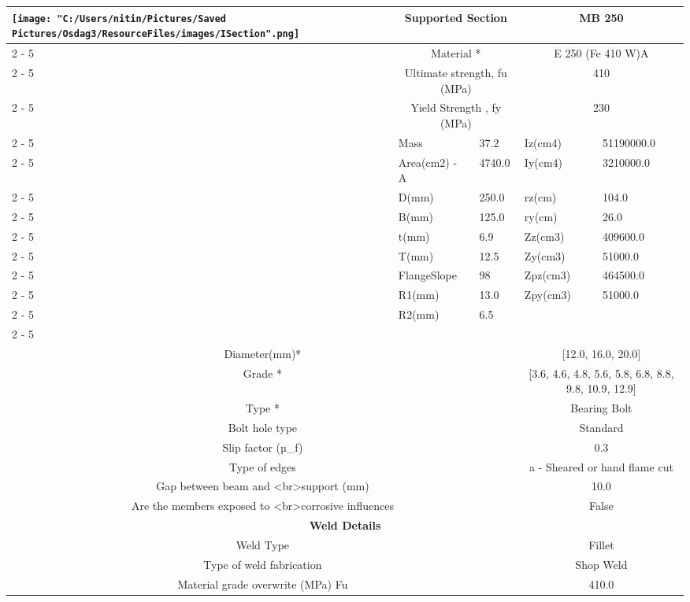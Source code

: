 \documentclass{article}%
\begin{document}
\begin{longtable}{|p{5cm}|p{2cm}|p{2cm}|p{2cm}|p{5cm}|}
\hline%
\hline%
\multirow{13}{*}{\texttt{[image: "C:/Users/nitin/Pictures/Saved Pictures/Osdag3/ResourceFiles/images/ISection".png]}}&\multicolumn{2}{|c|}{Supported Section}&\multicolumn{2}{|c|}{MB 250}\\%
\cline{2%
-%
5}%
&\multicolumn{2}{|c|}{Material *}&\multicolumn{2}{|c|}{E 250 (Fe 410 W)A}\\%
\cline{2%
-%
5}%
&\multicolumn{2}{|c|}{Ultimate strength, fu (MPa)}&\multicolumn{2}{|c|}{410}\\%
\cline{2%
-%
5}%
&\multicolumn{2}{|c|}{Yield Strength , fy (MPa)}&\multicolumn{2}{|c|}{230}\\%
\cline{2%
-%
5}%
&Mass&37.2&Iz(cm4)&51190000.0\\%
\cline{2%
-%
5}%
&Area(cm2) {-} A&4740.0&Iy(cm4)&3210000.0\\%
\cline{2%
-%
5}%
&D(mm)&250.0&rz(cm)&104.0\\%
\cline{2%
-%
5}%
&B(mm)&125.0&ry(cm)&26.0\\%
\cline{2%
-%
5}%
&t(mm)&6.9&Zz(cm3)&409600.0\\%
\cline{2%
-%
5}%
&T(mm)&12.5&Zy(cm3)&51000.0\\%
\cline{2%
-%
5}%
&FlangeSlope&98&Zpz(cm3)&464500.0\\%
\cline{2%
-%
5}%
&R1(mm)&13.0&Zpy(cm3)&51000.0\\%
\cline{2%
-%
5}%
&R2(mm)&6.5&&\\%
\cline{2%
-%
5}%
\hline%
\multicolumn{5}{|c|}{\textbf{Bolt Details}}\\%
\hline%
\hline%
\multicolumn{3}{|c|}{Diameter(mm)*}&\multicolumn{2}{|c|}{{[}12.0, 16.0, 20.0{]}}\\%
\hline%
\hline%
\multicolumn{3}{|c|}{Grade *}&\multicolumn{2}{|c|}{{[}3.6, 4.6, 4.8, 5.6, 5.8, 6.8, 8.8, 9.8, 10.9, 12.9{]}}\\%
\hline%
\hline%
\multicolumn{3}{|c|}{Type *}&\multicolumn{2}{|c|}{Bearing Bolt}\\%
\hline%
\hline%
\multicolumn{3}{|c|}{Bolt hole type}&\multicolumn{2}{|c|}{Standard}\\%
\hline%
\hline%
\multicolumn{3}{|c|}{Slip factor (µ\_f)}&\multicolumn{2}{|c|}{0.3}\\%
\hline%
\hline%
\multicolumn{3}{|c|}{Type of edges}&\multicolumn{2}{|c|}{a {-} Sheared or hand flame cut}\\%
\hline%
\hline%
\multicolumn{3}{|c|}{Gap between beam and <br>support (mm)}&\multicolumn{2}{|c|}{10.0}\\%
\hline%
\hline%
\multicolumn{3}{|c|}{Are the members exposed to <br>corrosive influences}&\multicolumn{2}{|c|}{False}\\%
\hline%
\hline%
\multicolumn{5}{|c|}{\textbf{Weld Details}}\\%
\hline%
\hline%
\multicolumn{3}{|c|}{Weld Type}&\multicolumn{2}{|c|}{Fillet}\\%
\hline%
\hline%
\multicolumn{3}{|c|}{Type of weld fabrication}&\multicolumn{2}{|c|}{Shop Weld}\\%
\hline%
\hline%
\multicolumn{3}{|c|}{Material grade overwrite (MPa) Fu}&\multicolumn{2}{|c|}{410.0}\\%
\hline%
\end{longtable}
\end{document}

